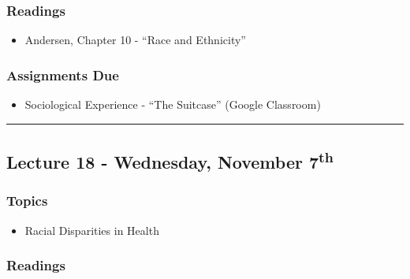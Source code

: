 \documentclass[]{book}
\providecommand{\tightlist}{%
  \setlength{\itemsep}{0pt}\setlength{\parskip}{0pt}}
\theoremstyle{definition}
\theoremstyle{definition}
\theoremstyle{definition}
\theoremstyle{remark}
\begin{document}
\hypertarget{readings-18}{%
\subsubsection*{Readings}\label{readings-18}}

\begin{itemize}
\tightlist
\item
  Andersen, Chapter 10 - ``Race and Ethnicity''
\end{itemize}

\hypertarget{assignments-due-4}{%
\subsubsection*{Assignments Due}\label{assignments-due-4}}

\begin{itemize}
\tightlist
\item
  Sociological Experience - ``The Suitcase'' (Google Classroom)
\end{itemize}

\begin{center}\rule{0.5\linewidth}{\linethickness}\end{center}

\hypertarget{lecture-18---wednesday-november-7th}{%
\subsection*{\texorpdfstring{Lecture 18 - Wednesday, November
7\textsuperscript{th}}{Lecture 18 - Wednesday, November 7th}}\label{lecture-18---wednesday-november-7th}}

\hypertarget{topics-21}{%
\subsubsection*{Topics}\label{topics-21}}

\begin{itemize}
\tightlist
\item
  Racial Disparities in Health
\end{itemize}

\hypertarget{readings-19}{%
\subsubsection*{Readings}\label{readings-19}}
\end{document}
